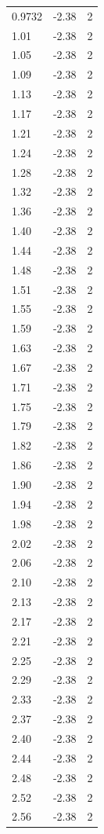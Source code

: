 \begin{longtable}{lrr}
  0.9732 & -2.38 & 2 \\
  1.01 & -2.38 & 2 \\
  1.05 & -2.38 & 2 \\
  1.09 & -2.38 & 2 \\
  1.13 & -2.38 & 2 \\
  1.17 & -2.38 & 2 \\
  1.21 & -2.38 & 2 \\
  1.24 & -2.38 & 2 \\
  1.28 & -2.38 & 2 \\
  1.32 & -2.38 & 2 \\
  1.36 & -2.38 & 2 \\
  1.40 & -2.38 & 2 \\
  1.44 & -2.38 & 2 \\
  1.48 & -2.38 & 2 \\
  1.51 & -2.38 & 2 \\
  1.55 & -2.38 & 2 \\
  1.59 & -2.38 & 2 \\
  1.63 & -2.38 & 2 \\
  1.67 & -2.38 & 2 \\
  1.71 & -2.38 & 2 \\
  1.75 & -2.38 & 2 \\
  1.79 & -2.38 & 2 \\
  1.82 & -2.38 & 2 \\
  1.86 & -2.38 & 2 \\
  1.90 & -2.38 & 2 \\
  1.94 & -2.38 & 2 \\
  1.98 & -2.38 & 2 \\
  2.02 & -2.38 & 2 \\
  2.06 & -2.38 & 2 \\
  2.10 & -2.38 & 2 \\
  2.13 & -2.38 & 2 \\
  2.17 & -2.38 & 2 \\
  2.21 & -2.38 & 2 \\
  2.25 & -2.38 & 2 \\
  2.29 & -2.38 & 2 \\
  2.33 & -2.38 & 2 \\
  2.37 & -2.38 & 2 \\
  2.40 & -2.38 & 2 \\
  2.44 & -2.38 & 2 \\
  2.48 & -2.38 & 2 \\
  2.52 & -2.38 & 2 \\
  2.56 & -2.38 & 2 \\

\end{longtable}
